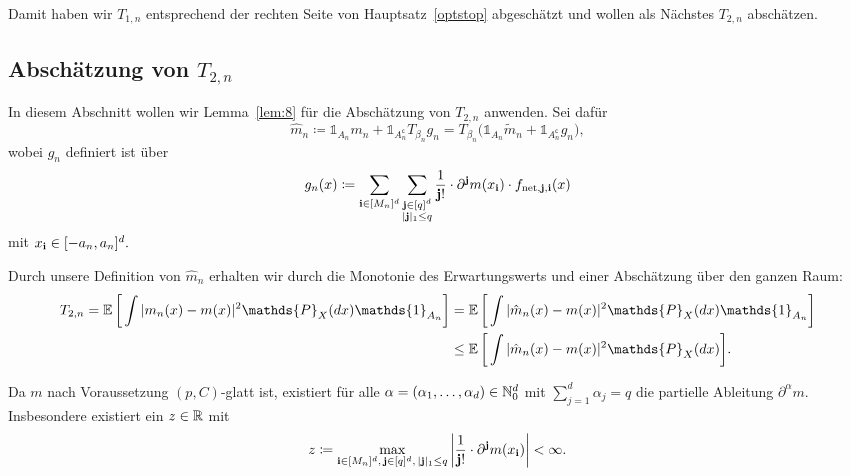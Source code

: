 Damit haben wir $T_{1,n}$ entsprechend der rechten Seite von Hauptsatz~\ref{optstop} abgeschätzt und wollen als Nächstes $T_{2,n}$ abschätzen.

\subsection{Abschätzung von $T_{2,n}$}

In diesem Abschnitt wollen wir Lemma~\ref{lem:8} für die Abschätzung von $T_{2,n}$ anwenden.
Sei dafür $$\hat{m}_n \coloneqq \mathds{1}_{A_n}m_n + \mathds{1}_{A_n^{\mathsf{c}}}T_{\beta_n}g_n = T_{\beta_n}\big(\mathds{1}_{A_n}\tilde{m}_n + \mathds{1}_{A_n^{\mathsf{c}}}g_n \big),$$
wobei $g_n$ definiert ist über
$$g_n(x) \coloneqq \sum_{\mathbf{i} \in [M_n]^d} \sum_{\substack{ \mathbf{j} \in [q]^d \\ |\mathbf{j}|_1 \leq q}} \frac{1}{\mathbf{j}!} \cdot \partial^{\mathbf{j}}m(x_{\mathbf{i}}) \cdot f_{\mathrm{net},\mathbf{j},\mathbf{i}}(x)$$
mit $x_{\mathbf{i}} \in [-a_n,a_n]^d.$

Durch unsere Definition von $\hat{m}_n$ erhalten wir durch die Monotonie des Erwartungswerts und einer Abschätzung über den ganzen Raum:
\begin{equation}
\label{an}
\begin{split}
T_{2,n} = \E \bigg[\int |m_n(x) - m(x)|^2 \mathds{P}_X(dx) \mathds{1}_{A_n}\bigg] & = \E \bigg[\int |\hat{m}_n(x) - m(x)|^2 \mathds{P}_X(dx) \mathds{1}_{A_n}\bigg] \\
& \leq \E \bigg[\int |\hat{m}_n(x) - m(x)|^2 \mathds{P}_X(dx)\bigg].
\end{split}
\end{equation}

Da $m$ nach Voraussetzung $(p,C)$-glatt ist, existiert für alle $\alpha = (\alpha_1,\dots,\alpha_d) \in \mathbb{N}_0^d$ mit $\sum_{j = 1}^d\alpha_j = q$ die partielle Ableitung $\partial^{\alpha}m$. Insbesondere existiert ein $z \in \mathbb{R}$ mit
\begin{equation}
\label{bound}
z \coloneqq \max_{\mathbf{i} \in [M_n]^d,\, \mathbf{j} \in [q]^d,\, |\mathbf{j}|_1 \leq q} \bigg|\frac{1}{\mathbf{j}!} \cdot \partial^{\mathbf{j}}m(x_{\mathbf{i}})\bigg| < \infty.
\end{equation}


